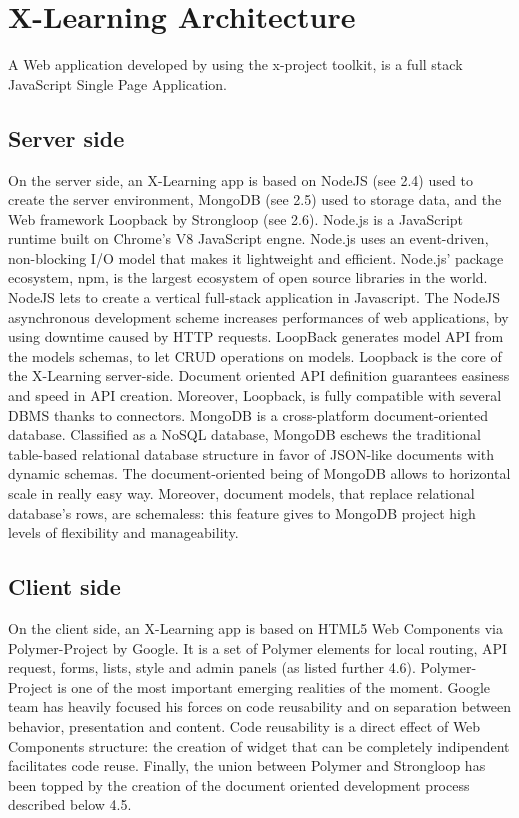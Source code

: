 \section{X-Learning  Architecture}
\label{sec:x-learning_architecture}

A Web application developed by using the x-project toolkit, is a full stack JavaScript Single Page Application.


\subsection{Server side}
\label{subsec:server_side}

On the server side, an X-Learning app is based on NodeJS (see 2.4) used to create the server environment, MongoDB (see 2.5) used to storage data, and the Web framework Loopback by Strongloop (see 2.6).
Node.js is a JavaScript runtime built on Chrome’s  V8  JavaScript  engne. Node.js uses an event-driven, non-blocking I/O model that makes it lightweight and efficient. Node.js’ package ecosystem, npm, is the largest ecosystem of open source libraries in the world. NodeJS lets to create a vertical full-stack application in Javascript. The NodeJS asynchronous development scheme increases performances of web applications, by using downtime caused  by  HTTP requests.
LoopBack generates model API from the models schemas, to let CRUD operations on models. Loopback is the core of the X-Learning server-side. Document oriented API definition guarantees easiness and speed in API creation. Moreover, Loopback, is fully compatible with several DBMS thanks to connectors.
MongoDB is a cross-platform document-oriented database.  Classified as a NoSQL database, MongoDB eschews the traditional table-based relational database structure in favor of JSON-like documents with dynamic schemas. The document-oriented being of MongoDB allows to horizontal scale in really easy way. Moreover, document models, that replace relational database’s rows, are schemaless: this feature gives to MongoDB project high levels of flexibility and manageability.

\subsection{Client side}
\label{subsec:client_side}

On the client side, an X-Learning app is based on HTML5 Web Components via Polymer-Project by Google. It is a set of Polymer elements for local routing, API request, forms, lists, style and admin panels (as listed further    4.6).
Polymer-Project is one of the most important emerging realities of the moment. Google team has heavily focused his forces on code reusability and on separation between behavior, presentation and content.  Code reusability is a direct effect of Web Components structure: the creation of widget that can be completely indipendent facilitates code reuse.
Finally, the union between Polymer and Strongloop has been topped by the creation of the document oriented development process described below 4.5.

